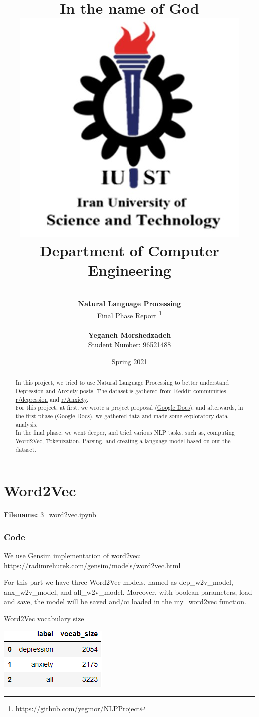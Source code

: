 \documentclass[12pt, a4paper]{article}
\title{
	{\Huge \textbf{In the name of God}}
	\\[20pt]
	\includegraphics[width=0.5\linewidth]{../assets/IUST_logo_color_eng.jpg} \\
	{\normalsize Department of Computer Engineering}
}
\author{
	\\[10pt]
	\textbf{{\LARGE Natural Language Processing}}
	\\[10pt]
	\LARGE Final Phase Report
	\thanks{\url{https://github.com/yegmor/NLPProject}}
	
	\\[30pt]
	\textbf{Yeganeh Morshedzadeh}
	\\[5pt]
	Student Number: 96521488
}
\date{Spring 2021}
\begin{document}
	
\maketitle
	
\clearpage
\tableofcontents
\newpage

\listoffigures
\newpage

\listoftables
\newpage

\begin{abstract}
	In this project, we tried to use Natural Language Processing to better understand Depression and Anxiety posts. The dataset is gathered from Reddit communities \href{https://www.reddit.com/r/depression}{r/depression} and \href{https://www.reddit.com/r/Anxiety}{r/Anxiety}.
	\\[10pt]
	
	For this project, at first, we wrote a project proposal (\href{https://docs.google.com/document/d/1tHGEmEgn8-sp8MD72d8NjnZsq-GpVupzsMWgnqaGi-Y/edit?usp=sharing}{Google Docs}), and afterwards, in the first phase (\href{https://docs.google.com/document/d/1Jc2ELhweU01Tbf0WalU7wVQABdAV4w50mhQnmMpU2mM/edit?usp=sharing}{Google Docs}), we gathered data and made some exploratory data analysis. 
	\\[10pt]
	
	In the final phase, we went deeper, and tried various NLP tasks, such as, computing Word2Vec, Tokenization, Parsing, and creating a language model based on our the dataset.
\end{abstract}

\newpage
\part{Word2Vec}
\large{\textbf{Filename:} 3\_word2vec.ipynb}

\section*{Code}
We use Gensim implementation of word2vec: https://radimrehurek.com/gensim/models/word2vec.html

For this part we have three Word2Vec models, named as dep\_w2v\_model, anx\_w2v\_model, and all\_w2v\_model. Moreover, with boolean parameters, load and save, the model will be saved and/or loaded in the my\_word2vec function.


\begin{table}[ht]
	\caption{Word2Vec vocabulary size} 
	\centering 
	\vspace{5mm} 
	\includegraphics[width=0.5\linewidth]{../reports/images/w2v_vocab-size.png}
	\label{table:nonlin} 
\end{table}
\end{document}

